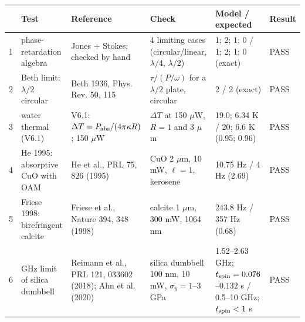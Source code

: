 \begin{tabular}{|p{0.3cm}|p{2.3cm}|p{2.8cm}|p{3.6cm}|p{4.25cm}|p{0.65cm}|}
\hline
 & Test & Reference & Check & Model / expected & Result \\
\hline
1 & phase-retardation algebra & Jones + Stokes; checked by hand & 4 limiting cases (circular/linear, $\lambda/4$, $\lambda/2$) & 1; 2; 1; 0 / 1; 2; 1; 0 (exact) & PASS \\
\hline
2 & Beth limit: $\lambda/2$ circular & Beth 1936, Phys. Rev. 50, 115 & $\tau/(P/\omega)$ for a $\lambda/2$ plate, circular & 2 / 2 (exact) & PASS \\
\hline
3 & water thermal (V6.1) & V6.1: $\Delta T=P_{\rm abs}/(4\pi\kappa R)$; 150 $\mu$W & $\Delta T$ at 150 $\mu$W, $R=1$ and 3 $\mu$m & 19.0; 6.34 K / 20; 6.6 K (0.95; 0.96) & PASS \\
\hline
4 & He 1995: absorptive CuO with OAM & He et al., PRL 75, 826 (1995) & CuO 2 $\mu$m, 10 mW, $\ell=1$, kerosene & 10.75 Hz / 4 Hz (2.69) & PASS \\
\hline
5 & Friese 1998: birefringent calcite & Friese et al., Nature 394, 348 (1998) & calcite 1 $\mu$m, 300 mW, 1064 nm & 243.8 Hz / 357 Hz (0.68) & PASS \\
\hline
6 & GHz limit of silica dumbbell & Reimann et al., PRL 121, 033602 (2018); Ahn et al. (2020) & silica dumbbell 100 nm, 10 mW, $\sigma_y=1$--3 GPa & 1.52--2.63 GHz; $t_{\rm spin}=0.076$--$0.132$ s / 0.5--10 GHz; $t_{\rm spin}<1$ s & PASS \\
\hline
\end{tabular}
